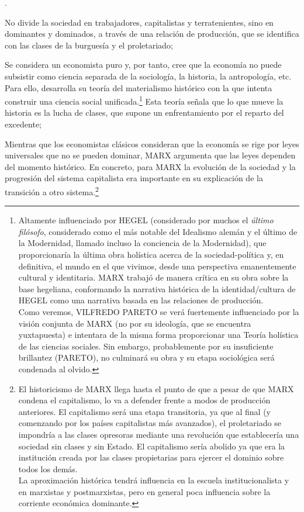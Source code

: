 \documentclass[10pt,a4paper]{article}
\newcounter{numitem}
\newenvironment{lnum}
      {\begin{list}{\arabic{numitem}.}{%
          \usecounter{numitem}%
          \setlength{\leftmargin}{1cm}%
          \setlength{\parskip}{3pt}%
          \setlength{\itemsep}{0pt}%
          \setlength{\parsep}{0pt}%
      }}
      {\end{list}}
\begin{document}
\begin{lnum}
    \item No divide la sociedad en trabajadores, capitalistas y terratenientes, sino en dominantes y dominados, a través de una relación de producción, que se identifica con las clases de la burguesía y el proletariado;
    \item Se considera un economista puro y, por tanto, cree que la economía no puede subsistir como ciencia separada de la sociología, la historia, la antropología, etc. Para ello, desarrolla su teoría del materialismo histórico con la que intenta construir una ciencia social unificada.\footnote{%
        Altamente influenciado por HEGEL (considerado por muchos el \textit{último filósofo}, considerado como el más notable del Idealismo alemán y el último de la Modernidad, llamado incluso la conciencia de la Modernidad), que proporcionaría la última obra holística acerca de la sociedad-política y, en definitiva, el mundo en el que vivimos, desde una perspectiva emanentemente cultural y identitaria. MARX trabajó de manera crítica en su obra sobre la base hegeliana, conformando la narrativa histórica de la identidad/cultura de HEGEL como una narrativa basada en las relaciones de producción.\\
    Como veremos, VILFREDO PARETO se verá fuertemente influenciado por la visión conjunta de MARX (no por su ideología, que se encuentra yuxtapuesta) e intentara de la misma forma proporcionar una Teoría holística de las ciencias sociales. Sin embargo, probablemente por su insuficiente brillantez (PARETO), no culminará su obra y su etapa sociológica será condenada al olvido.
    } Esta teoría señala que lo que mueve la historia es la lucha de clases, que supone un enfrentamiento por el reparto del excedente;
    \item Mientras que los economistas clásicos consideran que la economía se rige por leyes universales que no se pueden dominar, MARX argumenta que las leyes dependen del momento histórico. En concreto, para MARX la evolución de la sociedad y la progresión del sistema capitalista era importante en su explicación de la transición a otro sistema.\footnote{%
        El historicismo de MARX llega hasta el punto de que a pesar de que MARX condena el capitalismo, lo va a defender frente a modos de producción anteriores. El capitalismo será una etapa transitoria, ya que al final (y comenzando por los países capitalistas más avanzados), el proletariado se impondría a las clases opresoras mediante una revolución que establecería una sociedad sin clases y sin Estado. El capitalismo sería abolido ya que era la institución creada por las clases propietarias para ejercer el dominio sobre todos los demás.\\La aproximación histórica tendrá influencia en la escuela institucionalista y en marxistas y postmarxistas, pero en general poca influencia sobre la corriente económica dominante.
    } 
\end{lnum}
\end{document}
